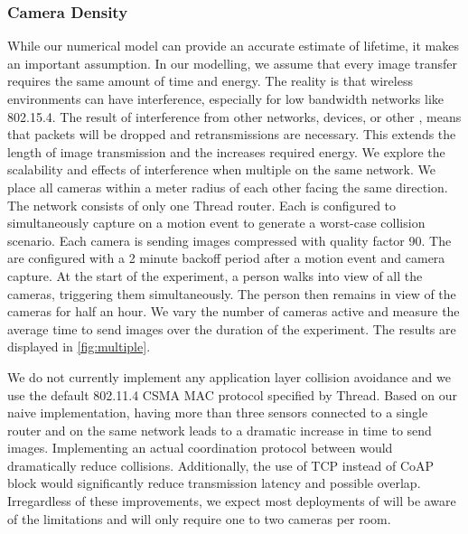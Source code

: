 \subsubsection{Camera Density}
While our numerical model can provide an accurate estimate of lifetime, it makes an important assumption. In our modelling, we assume that every image transfer requires the same amount of time and energy. The reality is that wireless environments can have interference, especially for low bandwidth networks like 802.15.4. The result of interference from other networks, devices, or other \namecs, means that packets will be dropped and retransmissions are necessary. This extends the length of image transmission and the increases required energy. 
We explore the scalability and effects of interference when multiple \namecs on the same network. We place all cameras within a meter radius of each other facing the same direction. The network consists of only one Thread router. Each \name is configured to simultaneously capture on a motion event to generate a worst-case collision scenario. Each camera is sending images compressed with quality factor 90.
The \namecs are configured with a 2 minute backoff period after a motion event and camera capture. At the start of the experiment, a person walks into view of all the cameras, triggering them simultaneously. The person then remains in view of the cameras for half an hour. We vary the number of cameras active and measure the average time to send images over the duration of the experiment. The results are displayed in \cref{fig:multiple}.


We do not currently implement any application layer collision avoidance and we use the default 802.11.4 CSMA MAC protocol specified by Thread. Based on our naive implementation, having more than three \name sensors connected to a single router and on the same network leads to a dramatic increase in time to send images. Implementing an actual coordination protocol between \namecs would dramatically reduce collisions. Additionally, the use of  TCP instead of CoAP block would significantly reduce transmission latency and possible overlap.
Irregardless of these improvements, we expect most deployments of \name will be aware of the limitations and will only require one to two cameras per room.

